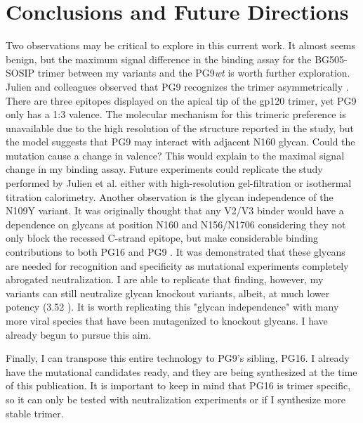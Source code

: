 \section{Conclusions and Future Directions}
Two observations may be critical to explore in this current work. It almost seems benign, but the maximum signal difference in the binding assay for the BG505-SOSIP trimer between my variants and the PG9\textit{wt} is worth further exploration. Julien and colleagues observed that PG9 recognizes the trimer asymmetrically \citep{Julien:2013jp}. There are three epitopes displayed on the apical tip of the gp120 trimer, yet PG9 only has a 1:3 valence. The molecular mechanism for this trimeric preference is unavailable due to the high resolution of the structure reported in the study, but the model suggests that PG9 may interact with adjacent N160 glycan. Could the mutation cause a change in valence? This would explain to the maximal signal change in my binding assay. Future experiments could replicate the study performed by Julien et al. either with high-resolution gel-filtration or isothermal titration calorimetry.
Another observation is the glycan independence of the N109Y variant. It was originally thought that any V2/V3 binder would have a dependence on glycans at position N160 and N156/N1706 considering they not only block the recessed C-strand epitope, but make considerable binding contributions to both PG16 and PG9 \citep{McLellan:2011dg,Pancera:2013ev}. It was demonstrated that these glycans are needed for recognition and specificity as mutational experiments completely abrogated neutralization. I are able to replicate that finding, however, my variants can still neutralize glycan knockout variants, albeit, at much lower potency (3.52 \mcml). It is worth replicating this "glycan independence" with many more viral species that have been mutagenized to knockout glycans. I have already begun to pursue this aim.

Finally, I can transpose this entire technology to PG9's sibling, PG16. I already have the mutational candidates ready, and they are being synthesized at the time of this publication. It is important to keep in mind that PG16 is trimer specific, so it can only be tested with neutralization experiments or if I synthesize more stable trimer.




